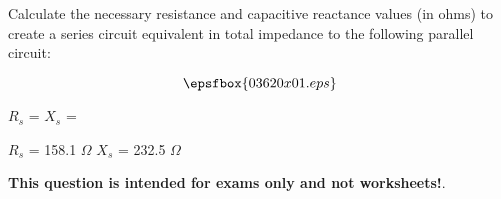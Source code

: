 

Calculate the necessary resistance and capacitive reactance values (in ohms) to create a series circuit equivalent in total impedance to the following parallel circuit:

$$\epsfbox{03620x01.eps}$$

\vskip 10pt

$R_s$ = \hskip 150pt $X_s$ = 







$R_s$ = 158.1 $\Omega$ \hskip 100pt $X_s$ = 232.5 $\Omega$







{\bf This question is intended for exams only and not worksheets!}.



